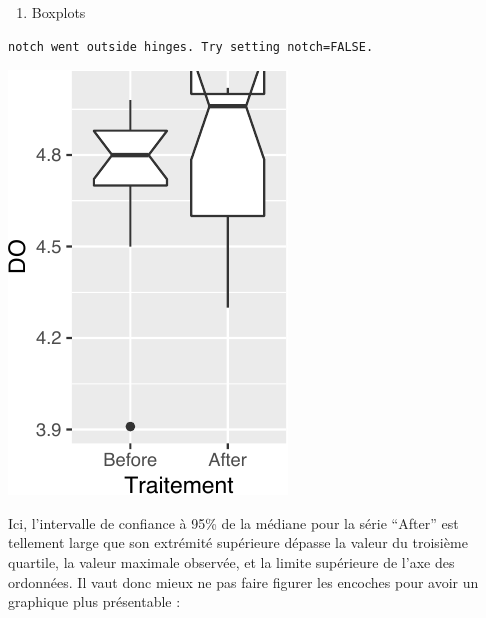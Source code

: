 \documentclass[
  a4paper,
]{article}
\newenvironment{Shaded}{\begin{snugshade}}{\end{snugshade}}
\newcommand{\DataTypeTok}[1]{\textcolor[rgb]{0.00,0.34,0.68}{#1}}
\newcommand{\KeywordTok}[1]{\textcolor[rgb]{0.12,0.11,0.11}{\textbf{#1}}}
\newcommand{\NormalTok}[1]{\textcolor[rgb]{0.12,0.11,0.11}{#1}}
\newcommand{\OperatorTok}[1]{\textcolor[rgb]{0.12,0.11,0.11}{#1}}
\newcommand{\OtherTok}[1]{\textcolor[rgb]{0.00,0.43,0.16}{#1}}
\newcommand{\StringTok}[1]{\textcolor[rgb]{0.75,0.01,0.01}{#1}}
\providecommand{\tightlist}{%
  \setlength{\itemsep}{0pt}\setlength{\parskip}{0pt}}
\begin{document}
\begin{enumerate}
\def\labelenumi{\arabic{enumi}.}
\setcounter{enumi}{2}
\tightlist
\item
  Boxplots
\end{enumerate}

\begin{Shaded}
\end{Shaded}

\begin{verbatim}
notch went outside hinges. Try setting notch=FALSE.
\end{verbatim}

\begin{center}\includegraphics[width=0.25\linewidth]{figure/unnamed-chunk-34-1} \end{center}

Ici, l'intervalle de confiance à 95\% de la médiane pour la série ``After'' est tellement large que son extrémité supérieure dépasse la valeur du troisième quartile, la valeur maximale observée, et la limite supérieure de l'axe des ordonnées. Il vaut donc mieux ne pas faire figurer les encoches pour avoir un graphique plus présentable :

\begin{Shaded}
\end{Shaded}
\end{document}
